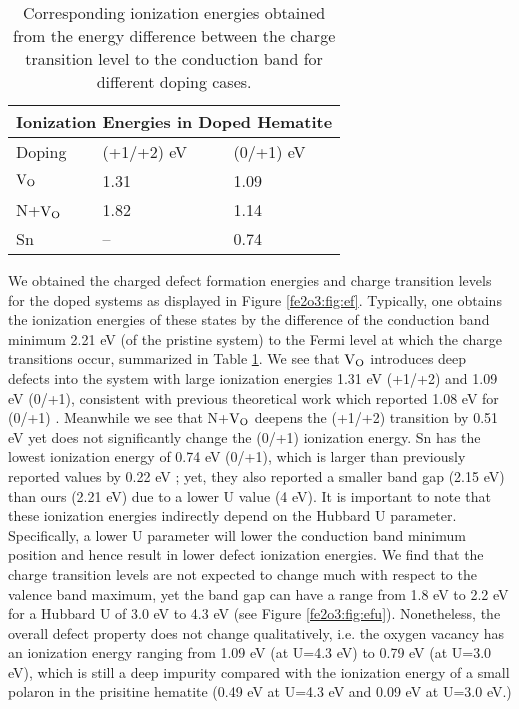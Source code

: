 \begin{table}[t!]
\begin{center}
\begin{tabular}{p{2.5cm}p{2.5cm}p{2.5cm}}
 \hline
 \multicolumn{3}{c}{ Ionization Energies in Doped Hematite \vspace{0.5mm}} \\
 \hline
 Doping & (+1/+2) eV & (0/+1) eV\\
 \hline
 $\text{V}_\text{O}$ & 1.31  & 1.09 \\
 N+$\text{V}_\text{O}$& 1.82 & 1.14 \\
 Sn & -- & 0.74 \\
 \hline
\end{tabular}
\end{center}
\caption{Corresponding ionization energies obtained from the energy difference between the charge transition level to the conduction band for different doping cases.} \label{fe2o3:table:ef}
\end{table}




We obtained the charged defect formation energies and charge transition levels for the doped systems as displayed in Figure \ref{fe2o3:fig:ef}. Typically, one obtains the ionization energies of these states by the difference of the conduction band minimum 2.21 eV (of the pristine system) to the Fermi level at which the charge transitions occur, summarized in Table \ref{fe2o3:table:ef}. We see that $\text{V}_\text{O}$ introduces deep defects into the system with large ionization energies 1.31 eV (+1/+2) and 1.09 eV (0/+1), consistent with previous theoretical work which reported 1.08 eV for (0/+1) \cite{lee2013thermodynamics}. Meanwhile we see that N+$\text{V}_\text{O}$ deepens the (+1/+2) transition by 0.51 eV yet does not significantly change the (0/+1) ionization energy. Sn has the lowest ionization energy of 0.74 eV (0/+1), which is larger than previously reported values by 0.22 eV \cite{zhou2015understanding}; yet, they also reported a smaller band gap (2.15 eV) than ours (2.21 eV) due to a lower U value (4 eV). It is important to note that these ionization energies indirectly depend on the Hubbard U parameter. Specifically, a lower U parameter will lower the conduction band minimum position and hence result in lower defect ionization energies. We find that the charge transition levels are not expected to change much with respect to the valence band maximum, yet the band gap can have a range from 1.8 eV to 2.2 eV for a Hubbard U of 3.0 eV to 4.3 eV (see Figure \ref{fe2o3:fig:efu}). Nonetheless, the overall defect property does not change qualitatively, i.e. the oxygen vacancy has an ionization energy ranging from 1.09 eV (at U=4.3 eV) to 0.79 eV (at U=3.0 eV), which is still a deep impurity compared with the ionization energy of a small polaron in the prisitine hematite (0.49 eV at U=4.3 eV and 0.09 eV at U=3.0 eV.)

